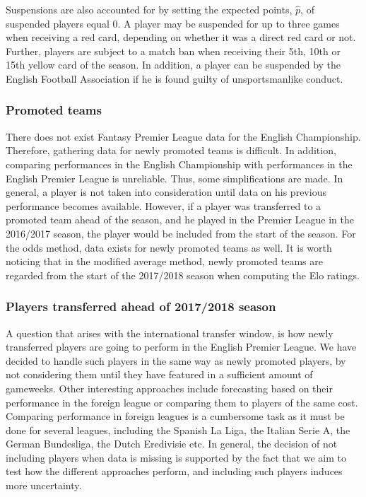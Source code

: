 \newpar

Suspensions are also accounted for by setting the expected points, $\hat{p}$, of suspended players equal 0. A player may be suspended for up to three games when receiving a red card, depending on whether it was a direct red card or not. Further, players are subject to a match ban when receiving their 5th, 10th or 15th yellow card of the season. In addition, a player can be suspended by the English Football Association if he is found guilty of unsportsmanlike conduct. 


\subsubsection{Promoted teams}
There does not exist Fantasy Premier League data for the English Championship. Therefore, gathering data for newly promoted teams is difficult. In addition, comparing performances in the English Championship with performances in the English Premier League is unreliable. Thus, some simplifications are made. In general, a player is not taken into consideration until data on his previous performance becomes available. However, if a player was transferred to a promoted team ahead of the season, and he played in the Premier League in the 2016/2017 season, the player would be included from the start of the season. For the odds method, data exists for newly promoted teams as well. It is worth noticing that in the modified average method, newly promoted teams are regarded from the start of the 2017/2018 season when computing the Elo ratings. 

\subsubsection{Players transferred ahead of 2017/2018 season}
A question that arises with the international transfer window, is how newly transferred players are going to perform in the English Premier League. We have decided to handle such players in the same way as newly promoted players, by not considering them until they have featured in a sufficient amount of gameweeks. Other interesting approaches include forecasting based on their performance in the foreign league or comparing them to players of the same cost. Comparing performance in foreign leagues is a cumbersome task as it must be done for several leagues, including the Spanish La Liga, the Italian Serie A, the German Bundesliga, the Dutch Eredivisie etc. In general, the decision of not including players when data is missing is supported by the fact that we aim to test how the different approaches perform, and including such players induces more uncertainty.


